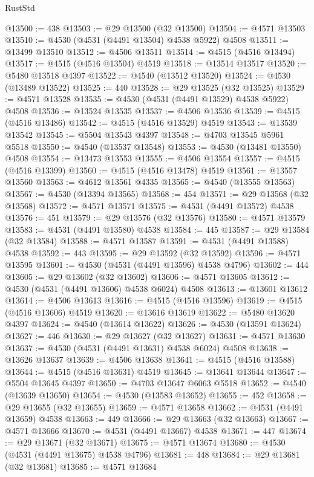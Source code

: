 \begin{lexlean}{RustStd}
\begin{coremodule}
@13500 := 438
@13503 := @29 @13500 (@32 @13500)
@13504 := @4571 @13503
@13510 := @4530 (@4531 (@4491 @13504) @4538 @5922) @4508
@13511 := @13499 @13510
@13512 := @4506 @13511
@13514 := @4515 (@4516 @13494)
@13517 := @4515 (@4516 @13504) @4519
@13518 := @13514 @13517
@13520 := @5480 @13518 @4397
@13522 := @4540 (@13512 @13520)
@13524 := @4530 (@13489 @13522)
@13525 := 440
@13528 := @29 @13525 (@32 @13525)
@13529 := @4571 @13528
@13535 := @4530 (@4531 (@4491 @13529) @4538 @5922) @4508
@13536 := @13524 @13535
@13537 := @4506 @13536
@13539 := @4515 (@4516 @13486)
@13542 := @4515 (@4516 @13529) @4519
@13543 := @13539 @13542
@13545 := @5504 @13543 @4397
@13548 := @4703 @13545 @5961 @5518
@13550 := @4540 (@13537 @13548)
@13553 := @4530 (@13481 @13550) @4508
@13554 := @13473 @13553
@13555 := @4506 @13554
@13557 := @4515 (@4516 @13399)
@13560 := @4515 (@4516 @13478) @4519
@13561 := @13557 @13560
@13563 := @4612 @13561 @4335
@13565 := @4540 (@13555 @13563)
@13567 := @4530 (@13394 @13565)
@13568 := 454
@13571 := @29 @13568 (@32 @13568)
@13572 := @4571 @13571
@13575 := @4531 (@4491 @13572) @4538
@13576 := 451
@13579 := @29 @13576 (@32 @13576)
@13580 := @4571 @13579
@13583 := @4531 (@4491 @13580) @4538
@13584 := 445
@13587 := @29 @13584 (@32 @13584)
@13588 := @4571 @13587
@13591 := @4531 (@4491 @13588) @4538
@13592 := 443
@13595 := @29 @13592 (@32 @13592)
@13596 := @4571 @13595
@13601 := @4530 (@4531 (@4491 @13596) @4538 @4796)
@13602 := 444
@13605 := @29 @13602 (@32 @13602)
@13606 := @4571 @13605
@13612 := @4530 (@4531 (@4491 @13606) @4538 @6024) @4508
@13613 := @13601 @13612
@13614 := @4506 @13613
@13616 := @4515 (@4516 @13596)
@13619 := @4515 (@4516 @13606) @4519
@13620 := @13616 @13619
@13622 := @5480 @13620 @4397
@13624 := @4540 (@13614 @13622)
@13626 := @4530 (@13591 @13624)
@13627 := 446
@13630 := @29 @13627 (@32 @13627)
@13631 := @4571 @13630
@13637 := @4530 (@4531 (@4491 @13631) @4538 @6024) @4508
@13638 := @13626 @13637
@13639 := @4506 @13638
@13641 := @4515 (@4516 @13588)
@13644 := @4515 (@4516 @13631) @4519
@13645 := @13641 @13644
@13647 := @5504 @13645 @4397
@13650 := @4703 @13647 @6063 @5518
@13652 := @4540 (@13639 @13650)
@13654 := @4530 (@13583 @13652)
@13655 := 452
@13658 := @29 @13655 (@32 @13655)
@13659 := @4571 @13658
@13662 := @4531 (@4491 @13659) @4538
@13663 := 449
@13666 := @29 @13663 (@32 @13663)
@13667 := @4571 @13666
@13670 := @4531 (@4491 @13667) @4538
@13671 := 447
@13674 := @29 @13671 (@32 @13671)
@13675 := @4571 @13674
@13680 := @4530 (@4531 (@4491 @13675) @4538 @4796)
@13681 := 448
@13684 := @29 @13681 (@32 @13681)
@13685 := @4571 @13684

\end{coremodule}
\end{lexlean}
